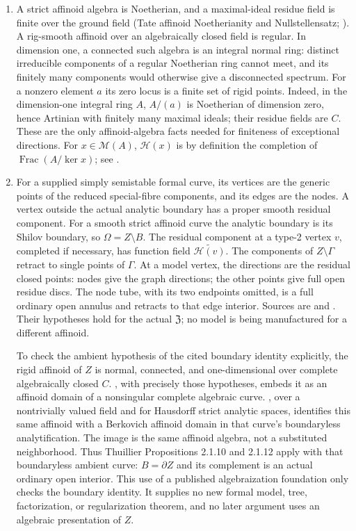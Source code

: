 \documentclass[11pt]{article}
\begin{document}
\begin{enumerate}
\item A strict affinoid algebra is Noetherian, and a maximal-ideal
residue field is finite over the ground field (Tate affinoid
Noetherianity and Nullstellensatz; \cite[\S6.1.2]{BGR}). A rig-smooth
affinoid over an algebraically closed field is regular. In dimension
one, a connected such algebra is an integral normal ring: distinct
irreducible components of a regular Noetherian ring cannot meet, and
its finitely many components would otherwise give a disconnected
spectrum. For a nonzero element $a$ its zero locus is a finite set of
rigid points. Indeed, in the dimension-one integral ring $A$, $A/(a)$
is Noetherian of dimension zero, hence Artinian with finitely many
maximal ideals; their residue fields are $C$. These are the only
affinoid-algebra facts needed for finiteness of exceptional directions.
For $x\in\mathcal M(A)$, $\mathcal H(x)$ is by definition the completion
of $\operatorname{Frac}(A/\ker x)$; see
\cite[\S2.1.1, immediately before Proposition 2.1.1]{Thu}.

\item For a supplied simply semistable formal curve, its vertices are
the generic points of the reduced special-fibre components, and its
edges are the nodes. A vertex outside the actual analytic boundary has
a proper smooth residual component. For a smooth strict affinoid curve
the analytic boundary is its Shilov boundary, so $\Omega=Z\setminus B$.
The residual component at a type-2 vertex $v$, completed if necessary,
has function field $\widetilde{\mathcal H(v)}$.
The components of $Z\setminus\Gamma$ retract to single points of
$\Gamma$. At a model vertex, the directions are the residual closed
points: nodes give the graph directions; the other points give full
open residue discs. The node tube, with its two endpoints omitted,
is a full ordinary open annulus and retracts to that edge interior.
Sources are \cite[Proposition 2.1.2, Proposition 2.1.12,
\S2.2.2--2.2.3, and the proper-component criterion in the proof of
Proposition 2.2.24]{Thu} and \cite[15.2]{GJR}.
Their hypotheses hold for the actual $\mathfrak Z$; no model is being
manufactured for a different affinoid.

To check the ambient hypothesis of the cited boundary identity
explicitly, the rigid affinoid of $Z$ is normal, connected, and
one-dimensional over complete algebraically closed $C$.
\cite[Theorem 1.1]{VdP}, with precisely those hypotheses, embeds
it as an affinoid domain of a nonsingular complete algebraic curve.
\cite[Theorem 1.6.1 and Lemma 1.6.2(i)]{Ber}, over a nontrivially
valued field and for Hausdorff strict analytic spaces, identifies
this same affinoid with a Berkovich affinoid domain in that curve's
boundaryless analytification. The image is the same affinoid
algebra, not a substituted neighborhood. Thus Thuillier
Propositions 2.1.10 and 2.1.12 apply with that boundaryless ambient
curve: $B=\partial Z$ and its complement is an actual ordinary
open interior. This use of a published algebraization foundation
only checks the boundary identity. It supplies no new formal model,
tree, factorization, or regularization theorem, and no later
argument uses an algebraic presentation of $Z$.


\end{enumerate}
\end{document}
